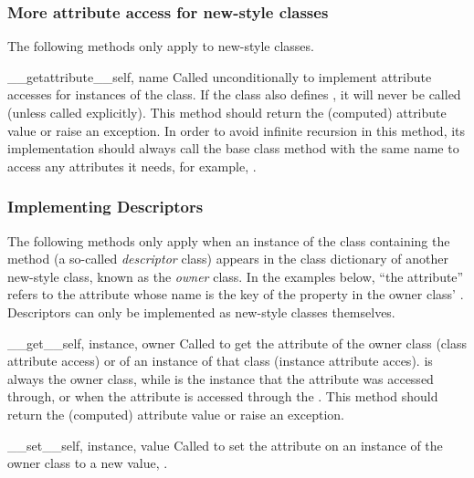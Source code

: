 \subsubsection{More attribute access for new-style classes \label{new-style-attribute-access}}

The following methods only apply to new-style classes.

\begin{methoddesc}[object]{__getattribute__}{self, name}
Called unconditionally to implement attribute accesses for instances
of the class. If the class also defines , it will
never be called (unless called explicitly).
This method should return the (computed) attribute
value or raise an  exception.
In order to avoid infinite recursion in this method, its
implementation should always call the base class method with the same
name to access any attributes it needs, for example,
.
\end{methoddesc}

\subsubsection{Implementing Descriptors \label{descriptors}}

The following methods only apply when an instance of the class
containing the method (a so-called \emph{descriptor} class) appears in
the class dictionary of another new-style class, known as the
\emph{owner} class. In the examples below, ``the attribute'' refers to
the attribute whose name is the key of the property in the owner
class' .  Descriptors can only be implemented as
new-style classes themselves.

\begin{methoddesc}[object]{__get__}{self, instance, owner}
Called to get the attribute of the owner class (class attribute access)
or of an instance of that class (instance attribute acces).
 is always the owner class, while  is the
instance that the attribute was accessed through, or  when
the attribute is accessed through the .  This method should
return the (computed) attribute value or raise an
 exception.
\end{methoddesc}

\begin{methoddesc}[object]{__set__}{self, instance, value}
Called to set the attribute on an instance  of the owner
class to a new value, .
\end{methoddesc}

